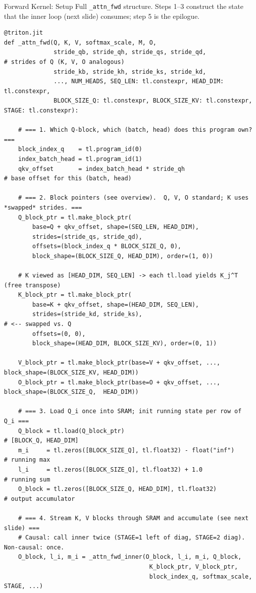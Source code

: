 \begin{frame}[fragile]{Forward Kernel: Setup}
  Full \texttt{\_attn\_fwd} structure. Steps 1--3 construct the state that the
  inner loop (next slide) consumes; step 5 is the epilogue.

\begin{lstlisting}
@triton.jit
def _attn_fwd(Q, K, V, softmax_scale, M, O,
              stride_qb, stride_qh, stride_qs, stride_qd,             # strides of Q (K, V, O analogous)
              stride_kb, stride_kh, stride_ks, stride_kd,
              ..., NUM_HEADS, SEQ_LEN: tl.constexpr, HEAD_DIM: tl.constexpr,
              BLOCK_SIZE_Q: tl.constexpr, BLOCK_SIZE_KV: tl.constexpr, STAGE: tl.constexpr):

    # === 1. Which Q-block, which (batch, head) does this program own? ===
    block_index_q    = tl.program_id(0)
    index_batch_head = tl.program_id(1)
    qkv_offset       = index_batch_head * stride_qh                   # base offset for this (batch, head)

    # === 2. Block pointers (see overview).  Q, V, O standard; K uses *swapped* strides. ===
    Q_block_ptr = tl.make_block_ptr(
        base=Q + qkv_offset, shape=(SEQ_LEN, HEAD_DIM),
        strides=(stride_qs, stride_qd),
        offsets=(block_index_q * BLOCK_SIZE_Q, 0),
        block_shape=(BLOCK_SIZE_Q, HEAD_DIM), order=(1, 0))

    # K viewed as [HEAD_DIM, SEQ_LEN] -> each tl.load yields K_j^T (free transpose)
    K_block_ptr = tl.make_block_ptr(
        base=K + qkv_offset, shape=(HEAD_DIM, SEQ_LEN),
        strides=(stride_kd, stride_ks),                               # <-- swapped vs. Q
        offsets=(0, 0),
        block_shape=(HEAD_DIM, BLOCK_SIZE_KV), order=(0, 1))

    V_block_ptr = tl.make_block_ptr(base=V + qkv_offset, ...,  block_shape=(BLOCK_SIZE_KV, HEAD_DIM))
    O_block_ptr = tl.make_block_ptr(base=O + qkv_offset, ...,  block_shape=(BLOCK_SIZE_Q,  HEAD_DIM))

    # === 3. Load Q_i once into SRAM; init running state per row of Q_i ===
    Q_block = tl.load(Q_block_ptr)                                    # [BLOCK_Q, HEAD_DIM]
    m_i     = tl.zeros([BLOCK_SIZE_Q], tl.float32) - float("inf")     # running max
    l_i     = tl.zeros([BLOCK_SIZE_Q], tl.float32) + 1.0              # running sum
    O_block = tl.zeros([BLOCK_SIZE_Q, HEAD_DIM], tl.float32)          # output accumulator

    # === 4. Stream K, V blocks through SRAM and accumulate (see next slide) ===
    # Causal: call inner twice (STAGE=1 left of diag, STAGE=2 diag).  Non-causal: once.
    O_block, l_i, m_i = _attn_fwd_inner(O_block, l_i, m_i, Q_block,
                                         K_block_ptr, V_block_ptr,
                                         block_index_q, softmax_scale, STAGE, ...)


\end{lstlisting}
\end{frame}

